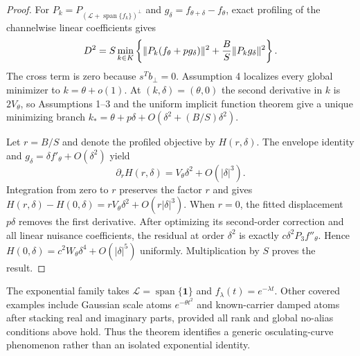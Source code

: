 \begin{proof}
For $P_k=P_{(\mathcal L+\operatorname{span}\{f_k\})^\perp}$ and
$g_\delta=f_{\theta+\delta}-f_\theta$, exact profiling of the channelwise
linear coefficients gives
\[
D^2=S\min_{k\in K}\left\{
\|P_k(f_\theta+pg_\delta)\|^2
+{B\over S}\|P_kg_\delta\|^2\right\}.
\]
The cross term is zero because $s^Tb_\perp=0$. Assumption 4 localizes every
global minimizer to $k=\theta+o(1)$.  At $(k,\delta)=(\theta,0)$ the second
derivative in $k$ is $2V_\theta$, so Assumptions 1--3 and the uniform implicit
function theorem give a unique minimizing branch
$k_*=\theta+p\delta+O(\delta^2+(B/S)\delta^2)$.

Let $r=B/S$ and denote the profiled objective by $H(r,\delta)$.  The envelope
identity and $g_\delta=\delta f'_\theta+O(\delta^2)$ yield
\[
\partial_rH(r,\delta)=V_\theta\delta^2+O(|\delta|^3).
\]
Integration from zero to $r$ preserves the factor $r$ and gives
$H(r,\delta)-H(0,\delta)=rV_\theta\delta^2+O(r|\delta|^3)$.
When $r=0$, the fitted displacement $p\delta$ removes the first derivative.
After optimizing its second-order correction and all linear nuisance
coefficients, the residual at order $\delta^2$ is exactly
$c\delta^2P_3f''_\theta$.  Hence
$H(0,\delta)=c^2W_\theta\delta^4+O(|\delta|^5)$ uniformly.  Multiplication by
$S$ proves the result.
\end{proof}

The exponential family takes $\mathcal L=\operatorname{span}\{\mathbf1\}$
and $f_\lambda(t)=e^{-\lambda t}$.  Other covered examples include Gaussian
scale atoms $e^{-\theta t^2}$ and known-carrier damped atoms after stacking real
and imaginary parts, provided all rank and global no-alias conditions above
hold. Thus the theorem identifies a generic
osculating-curve phenomenon rather than an isolated exponential identity.
